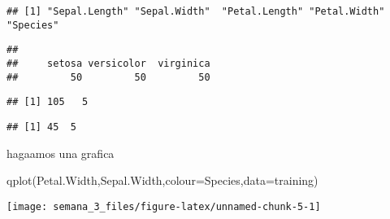 \documentclass[
]{article}
\newenvironment{Shaded}{\begin{snugshade}}{\end{snugshade}}
\newcommand{\AttributeTok}[1]{\textcolor[rgb]{0.77,0.63,0.00}{#1}}
\newcommand{\ConstantTok}[1]{\textcolor[rgb]{0.00,0.00,0.00}{#1}}
\newcommand{\FloatTok}[1]{\textcolor[rgb]{0.00,0.00,0.81}{#1}}
\newcommand{\FunctionTok}[1]{\textcolor[rgb]{0.00,0.00,0.00}{#1}}
\newcommand{\NormalTok}[1]{#1}
\newcommand{\OtherTok}[1]{\textcolor[rgb]{0.56,0.35,0.01}{#1}}
\newcommand{\SpecialCharTok}[1]{\textcolor[rgb]{0.00,0.00,0.00}{#1}}
\begin{document}
\begin{verbatim}
## [1] "Sepal.Length" "Sepal.Width"  "Petal.Length" "Petal.Width"  "Species"
\end{verbatim}

\begin{Shaded}
\end{Shaded}

\begin{verbatim}
## 
##     setosa versicolor  virginica 
##         50         50         50
\end{verbatim}

\begin{Shaded}
\end{Shaded}

\begin{verbatim}
## [1] 105   5
\end{verbatim}

\begin{verbatim}
## [1] 45  5
\end{verbatim}

hagaamos una grafica

\begin{Shaded}
\begin{Highlighting}[]
\FunctionTok{qplot}\NormalTok{(Petal.Width,Sepal.Width,}\AttributeTok{colour=}\NormalTok{Species,}\AttributeTok{data=}\NormalTok{training)}
\end{Highlighting}
\end{Shaded}

\begin{center}\texttt{[image: semana\_3\_files/figure-latex/unnamed-chunk-5-1]} \end{center}
\end{document}
